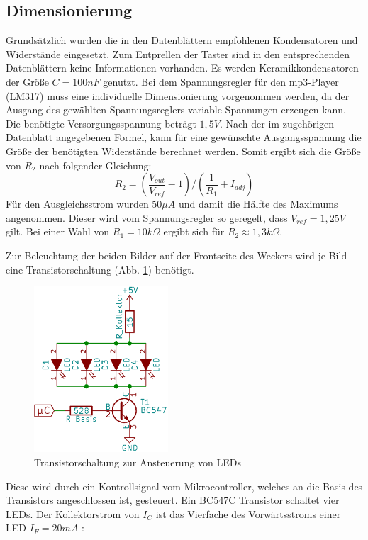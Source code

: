 \documentclass[journal, a4paper]{IEEEtran}
\begin{document}
	\subsection{Dimensionierung}
		\label{sc:Hardware:subsc:Dimensionierung}
		Grundsätzlich wurden die in den Datenblättern empfohlenen Kondensatoren und Widerstände eingesetzt. Zum Entprellen der Taster sind in den entsprechenden Datenblättern keine Informationen vorhanden. Es werden Keramikkondensatoren der Größe $C=100 nF$ genutzt. Bei dem Spannungsregler für den mp3-Player (LM317) muss eine individuelle Dimensionierung vorgenommen werden, da der Ausgang des gewählten Spannungsreglers variable Spannungen erzeugen kann.
		Die benötigte Versorgungsspannung beträgt $1,5 V$. Nach der im zugehörigen Datenblatt \cite{LM317} angegebenen Formel, kann für eine gewünschte Ausgangsspannung die Größe der benötigten Widerstände berechnet werden.  Somit ergibt sich die Größe von $R_2$ nach folgender Gleichung:
		\begin{equation}
			\label{eqn:1,5VDC}
			R_2 = (\frac{V_{out}}{V_{ref}}-1) / (\frac{1}{R_1}+I_{adj})
		\end{equation}	
		Für den Ausgleichsstrom wurden 50$\mu A$ und damit die Hälfte des Maximums angenommen. Dieser wird vom Spannungsregler so geregelt, dass $V_{ref} = 1,25 V$ gilt. Bei einer Wahl von $R_1 = 10k\Omega$ ergibt sich für $R_2 \approx 1,3 k\Omega$.\par
		Zur Beleuchtung der beiden Bilder auf der Frontseite des Weckers wird je Bild eine Transistorschaltung (Abb. \ref{fig:Transistor}) benötigt. 
		\begin{figure}
			\begin{center}	
				\includegraphics[width=5cm]{./Grafiken/Transistor.png}
				\caption{Transistorschaltung zur Ansteuerung von LEDs}
				\label{fig:Transistor}
			\end{center}
		\end{figure}
		Diese wird durch ein Kontrollsignal vom Mikrocontroller, welches an die Basis des Transistors angeschlossen ist, gesteuert. Ein BC547C Transistor schaltet vier LEDs. Der Kollektorstrom von $I_C$ ist das Vierfache des Vorwärtsstroms einer LED $I_F = 20mA$ \cite{LED}:
\end{document}
